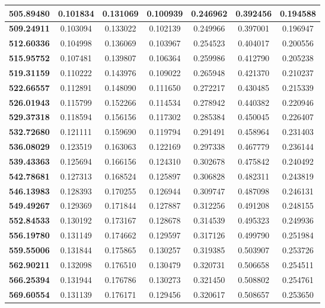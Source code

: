 \documentclass[10pt, a4paper]{article}
\begin{document}
\begin{appendices}
\begin{longtable}{|c|c|c|c|c|c|c|}
\textbf{505.89480} & 0.101834 & 0.131069 & 0.100939 & 0.246962 & 0.392456 & 0.194588 \\ \hline
\textbf{509.24911} & 0.103094 & 0.133022 & 0.102139 & 0.249966 & 0.397001 & 0.196947 \\ \hline
\textbf{512.60336} & 0.104998 & 0.136069 & 0.103967 & 0.254523 & 0.404017 & 0.200556 \\ \hline
\textbf{515.95752} & 0.107481 & 0.139807 & 0.106364 & 0.259986 & 0.412790 & 0.205238 \\ \hline
\textbf{519.31159} & 0.110222 & 0.143976 & 0.109022 & 0.265948 & 0.421370 & 0.210237 \\ \hline
\textbf{522.66557} & 0.112891 & 0.148090 & 0.111650 & 0.272217 & 0.430485 & 0.215339 \\ \hline
\textbf{526.01943} & 0.115799 & 0.152266 & 0.114534 & 0.278942 & 0.440382 & 0.220946 \\ \hline
\textbf{529.37318} & 0.118594 & 0.156156 & 0.117302 & 0.285384 & 0.450045 & 0.226407 \\ \hline
\textbf{532.72680} & 0.121111 & 0.159690 & 0.119794 & 0.291491 & 0.458964 & 0.231403 \\ \hline
\textbf{536.08029} & 0.123519 & 0.163063 & 0.122169 & 0.297338 & 0.467779 & 0.236144 \\ \hline
\textbf{539.43363} & 0.125694 & 0.166156 & 0.124310 & 0.302678 & 0.475842 & 0.240492 \\ \hline
\textbf{542.78681} & 0.127313 & 0.168524 & 0.125897 & 0.306828 & 0.482311 & 0.243819 \\ \hline
\textbf{546.13983} & 0.128393 & 0.170255 & 0.126944 & 0.309747 & 0.487098 & 0.246131 \\ \hline
\textbf{549.49267} & 0.129369 & 0.171844 & 0.127887 & 0.312256 & 0.491208 & 0.248155 \\ \hline
\textbf{552.84533} & 0.130192 & 0.173167 & 0.128678 & 0.314539 & 0.495323 & 0.249936 \\ \hline
\textbf{556.19780} & 0.131149 & 0.174662 & 0.129597 & 0.317126 & 0.499790 & 0.251984 \\ \hline
\textbf{559.55006} & 0.131844 & 0.175865 & 0.130257 & 0.319385 & 0.503907 & 0.253726 \\ \hline
\textbf{562.90211} & 0.132098 & 0.176510 & 0.130479 & 0.320731 & 0.506658 & 0.254511 \\ \hline
\textbf{566.25394} & 0.131944 & 0.176786 & 0.130273 & 0.321450 & 0.508802 & 0.254761 \\ \hline
\textbf{569.60554} & 0.131139 & 0.176171 & 0.129456 & 0.320617 & 0.508657 & 0.253650 \\ \hline

\end{longtable}
\end{appendices}
\end{document}
